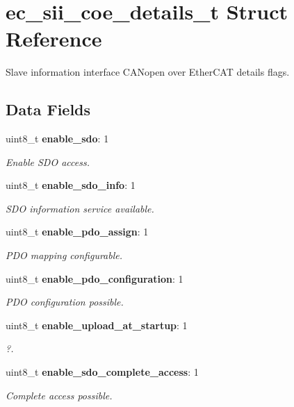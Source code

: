 \section{ec\-\_\-sii\-\_\-coe\-\_\-details\-\_\-t \-Struct \-Reference}
\label{structec__sii__coe__details__t}


\-Slave information interface \-C\-A\-Nopen over \-Ether\-C\-A\-T details flags.  


\subsection*{\-Data \-Fields}
\begin{DoxyCompactItemize}
\item 
uint8\-\_\-t {\bf enable\-\_\-sdo}\-: 1
\begin{DoxyCompactList}\small\item\em \-Enable \-S\-D\-O access. \end{DoxyCompactList}\item 
uint8\-\_\-t {\bf enable\-\_\-sdo\-\_\-info}\-: 1
\begin{DoxyCompactList}\small\item\em \-S\-D\-O information service available. \end{DoxyCompactList}\item 
uint8\-\_\-t {\bf enable\-\_\-pdo\-\_\-assign}\-: 1
\begin{DoxyCompactList}\small\item\em \-P\-D\-O mapping configurable. \end{DoxyCompactList}\item 
uint8\-\_\-t {\bf enable\-\_\-pdo\-\_\-configuration}\-: 1
\begin{DoxyCompactList}\small\item\em \-P\-D\-O configuration possible. \end{DoxyCompactList}\item 
uint8\-\_\-t {\bf enable\-\_\-upload\-\_\-at\-\_\-startup}\-: 1
\begin{DoxyCompactList}\small\item\em ?. \end{DoxyCompactList}\item 
uint8\-\_\-t {\bf enable\-\_\-sdo\-\_\-complete\-\_\-access}\-: 1
\begin{DoxyCompactList}\small\item\em \-Complete access possible. \end{DoxyCompactList}\end{DoxyCompactItemize}


